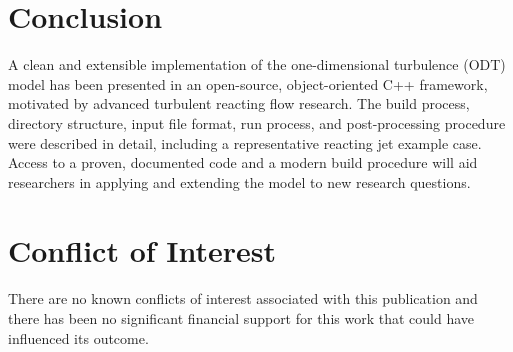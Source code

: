 \documentclass[preprint,12pt, a4paper]{elsarticle}
\begin{document}

\section{Conclusion}
\label{sec:conclusion}

A clean and extensible implementation of the one-dimensional turbulence (ODT) model has been presented in an open-source, object-oriented C++ framework, motivated by advanced turbulent reacting flow research. The build process, directory structure, input file format, run process, and post-processing procedure were described in detail, including a representative reacting jet example case. 
Access to a proven, documented code and a modern build procedure will aid researchers in applying and extending the model to new research questions. 

\section{Conflict of Interest}
%

There are no known conflicts of interest associated with this publication and there has been no significant financial support for this work that could have influenced its outcome.
\end{document}
